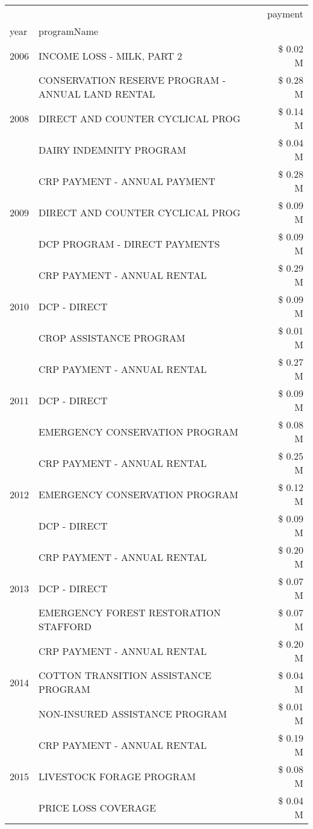 \begin{tabular}{llr}
\toprule
 &  & payment \\
year & programName &  \\
\midrule
2006 & INCOME LOSS - MILK, PART 2 & \$ 0.02 M \\
\cline{1-3}
\multirow[t]{3}{*}{2008} & CONSERVATION RESERVE PROGRAM - ANNUAL LAND RENTAL & \$ 0.28 M \\
 & DIRECT AND COUNTER CYCLICAL PROG & \$ 0.14 M \\
 & DAIRY INDEMNITY PROGRAM & \$ 0.04 M \\
\cline{1-3}
\multirow[t]{3}{*}{2009} & CRP PAYMENT - ANNUAL PAYMENT & \$ 0.28 M \\
 & DIRECT AND COUNTER CYCLICAL PROG & \$ 0.09 M \\
 & DCP PROGRAM - DIRECT PAYMENTS & \$ 0.09 M \\
\cline{1-3}
\multirow[t]{3}{*}{2010} & CRP PAYMENT - ANNUAL RENTAL & \$ 0.29 M \\
 & DCP - DIRECT & \$ 0.09 M \\
 & CROP ASSISTANCE PROGRAM & \$ 0.01 M \\
\cline{1-3}
\multirow[t]{3}{*}{2011} & CRP PAYMENT - ANNUAL RENTAL & \$ 0.27 M \\
 & DCP - DIRECT & \$ 0.09 M \\
 & EMERGENCY CONSERVATION PROGRAM & \$ 0.08 M \\
\cline{1-3}
\multirow[t]{3}{*}{2012} & CRP PAYMENT - ANNUAL RENTAL & \$ 0.25 M \\
 & EMERGENCY CONSERVATION PROGRAM & \$ 0.12 M \\
 & DCP - DIRECT & \$ 0.09 M \\
\cline{1-3}
\multirow[t]{3}{*}{2013} & CRP PAYMENT - ANNUAL RENTAL & \$ 0.20 M \\
 & DCP - DIRECT & \$ 0.07 M \\
 & EMERGENCY FOREST RESTORATION STAFFORD & \$ 0.07 M \\
\cline{1-3}
\multirow[t]{3}{*}{2014} & CRP PAYMENT - ANNUAL RENTAL & \$ 0.20 M \\
 & COTTON TRANSITION ASSISTANCE PROGRAM & \$ 0.04 M \\
 & NON-INSURED ASSISTANCE PROGRAM & \$ 0.01 M \\
\cline{1-3}
\multirow[t]{3}{*}{2015} & CRP PAYMENT - ANNUAL RENTAL & \$ 0.19 M \\
 & LIVESTOCK FORAGE PROGRAM & \$ 0.08 M \\
 & PRICE LOSS COVERAGE & \$ 0.04 M \\

\end{tabular}
